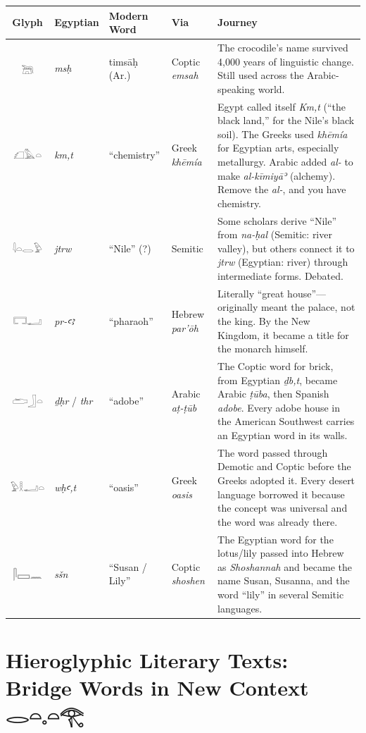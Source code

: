 \documentclass[11pt, a4paper]{article}
\newcommand{\hiero}[1]{{\normalfont\hierofont #1}}
\begin{document}
\begin{center}
\begin{tabular}{clllp{5.5cm}}
\toprule
\textbf{Glyph} & \textbf{Egyptian} & \textbf{Modern Word} & \textbf{Via} & \textbf{Journey} \\
\midrule
\hiero{𓆋} & \textit{msḥ} & timsāḥ (Ar.) & Coptic \textit{emsah} & The crocodile's name survived 4,000 years of linguistic change. Still used across the Arabic-speaking world. \\[6pt]
\hiero{𓆎𓅓𓏏} & \textit{km,t} & ``chemistry'' & Greek \textit{khēmía} & Egypt called itself \textit{Km,t} (``the black land,'' for the Nile's black soil). The Greeks used \textit{khēmía} for Egyptian arts, especially metallurgy. Arabic added \textit{al-} to make \textit{al-kīmiyāʾ} (alchemy). Remove the \textit{al-}, and you have chemistry. \\[6pt]
\hiero{𓇋𓏏𓂋𓅱} & \textit{jtrw} & ``Nile'' (?) & Semitic & Some scholars derive ``Nile'' from \textit{na-ḥal} (Semitic: river valley), but others connect it to \textit{jtrw} (Egyptian: river) through intermediate forms. Debated. \\[6pt]
\hiero{𓉐𓂝} & \textit{pr-ꜥꜣ} & ``pharaoh'' & Hebrew \textit{par'ōh} & Literally ``great house''---originally meant the palace, not the king. By the New Kingdom, it became a title for the monarch himself. \\[6pt]
\hiero{𓂧𓃀𓏏} & \textit{ḏḥr} / \textit{thr} & ``adobe'' & Arabic \textit{aṭ-ṭūb} & The Coptic word for brick, from Egyptian \textit{ḏb,t}, became Arabic \textit{ṭūba}, then Spanish \textit{adobe}. Every adobe house in the American Southwest carries an Egyptian word in its walls. \\[6pt]
\hiero{𓅱𓎛𓂝𓏏} & \textit{wḥꜥ,t} & ``oasis'' & Greek \textit{oasis} & The word passed through Demotic and Coptic before the Greeks adopted it. Every desert language borrowed it because the concept was universal and the word was already there. \\[6pt]
\hiero{𓋴𓈙𓈖} & \textit{sšn} & ``Susan / Lily'' & Coptic \textit{shoshen} & The Egyptian word for the lotus/lily passed into Hebrew as \textit{Shoshannah} and became the name Susan, Susanna, and the word ``lily'' in several Semitic languages. \\
\bottomrule
\end{tabular}
\end{center}


\section{Hieroglyphic Literary Texts: Bridge Words in New Context \hfill \hiero{𓂋𓏏𓈒𓏏𓂀}}
\end{document}
